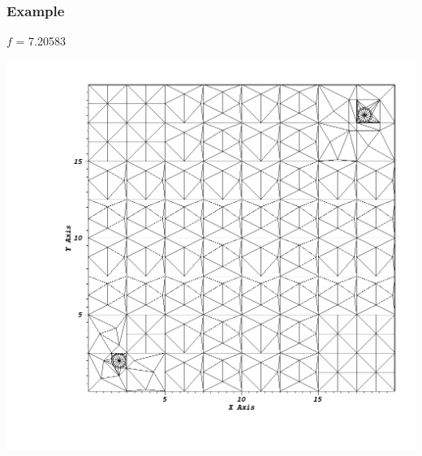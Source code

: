 \documentclass[]{beamer}
\begin{document}
\begin{frame}[t]\frametitle{Example}
\begin{minipage}{0.15\textwidth}
\begin{footnotesize}
$f$ = 7.20583
\end{footnotesize}
\end{minipage}
\begin{minipage}{0.8\textwidth}
\centering
\includegraphics[scale = 0.22]{figures/redistribute_before.png}
\end{minipage}
\end{frame}
\end{document}
